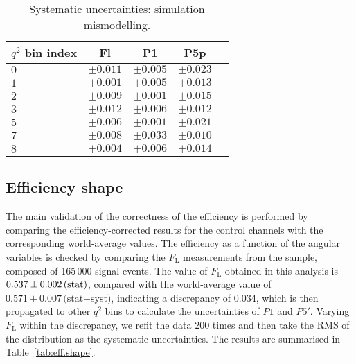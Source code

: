 \begin{table*}[!htb]
  \begin {center}
    \begin{small}
      \caption{Systematic uncertainties: simulation mismodelling.
        \label{tab:mis.modelling}}
      \begin{tabular}{|l|c|c|c|c|}
        \hline
        $q^2$ bin index  & Fl  & P1 & P5p \\
        \hline
        $ 0 $    &  $\pm0.011 $ & $\pm0.005$ & $\pm0.023 $ \\
        $ 1 $   &  $\pm0.001$  & $\pm0.005$ & $\pm0.013$  \\
        $ 2 $    &  $\pm0.009$  & $\pm0.001$  & $\pm0.015$\\
        $ 3 $    &  $\pm0.012$  & $\pm0.006$  & $\pm0.012$\\
        $ 5 $   &  $\pm0.006$   & $\pm0.001$ & $\pm0.021$\\
        $ 7 $   &  $\pm0.008$  & $\pm0.033$  & $\pm0.010$\\
        $ 8 $   &  $\pm0.004$  & $\pm0.006$   & $\pm0.014$\\
	\hline
      \end{tabular}
    \end{small}
  \end{center}
\end{table*}

\subsection{Efficiency shape}
\label{sec:effshape-syst}

The main validation of the correctness of the efficiency is performed by comparing the efficiency-corrected results for the control channels with the corresponding world-average values.
The efficiency as a function of the angular variables is checked by comparing the $F_\mathrm{L}$ measurements from the \BKsJ sample, composed of 165\,000 signal events.
The value of $F_\mathrm{L}$ obtained in this analysis is $0.537 \pm 0.002\,\textrm{(stat)}$, compared with the world-average value of $0.571 \pm 0.007\,\text{(stat+syst)}$, indicating a discrepancy of $0.034$, which is then propagated to other $q^2$ bins to calculate the uncertainties of $P1$ and $P5'$.
Varying $F_\mathrm{L}$ within the discrepancy, we refit the data 200 times and then take the RMS of the distribution as the systematic uncertainties.
The results are summarised in Table~\ref{tab:eff.shape}.

